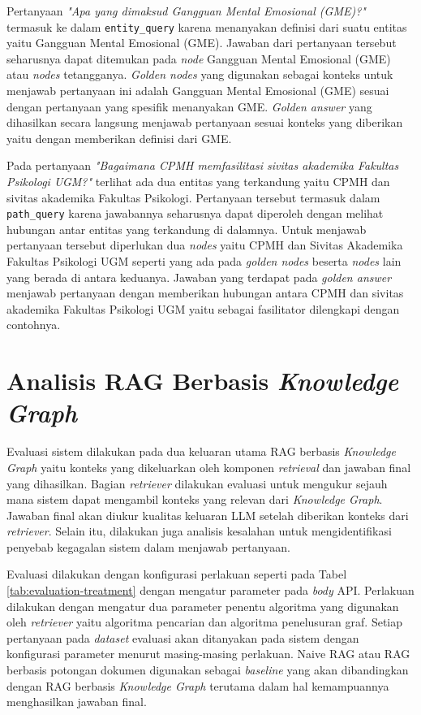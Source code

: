 Pertanyaan \textit{"Apa yang dimaksud Gangguan Mental Emosional (GME)?"} termasuk ke dalam \texttt{entity\_query} karena menanyakan definisi dari suatu entitas yaitu Gangguan Mental Emosional (GME).
Jawaban dari pertanyaan tersebut seharusnya dapat ditemukan pada \textit{node} Gangguan Mental Emosional (GME) atau \textit{nodes} tetangganya.
\textit{Golden nodes} yang digunakan sebagai konteks untuk menjawab pertanyaan ini adalah Gangguan Mental Emosional (GME) sesuai dengan pertanyaan yang spesifik menanyakan GME.
\textit{Golden answer} yang dihasilkan secara langsung menjawab pertanyaan sesuai konteks yang diberikan yaitu dengan memberikan definisi dari GME.

Pada pertanyaan \textit{"Bagaimana CPMH memfasilitasi sivitas akademika Fakultas Psikologi UGM?"} terlihat ada dua entitas yang terkandung yaitu CPMH dan sivitas akademika Fakultas Psikologi.
Pertanyaan tersebut termasuk dalam \texttt{path\_query} karena jawabannya seharusnya dapat diperoleh dengan melihat hubungan antar entitas yang terkandung di dalamnya.
Untuk menjawab pertanyaan tersebut diperlukan dua \textit{nodes} yaitu CPMH dan Sivitas Akademika Fakultas Psikologi UGM seperti yang ada pada \textit{golden nodes} beserta \textit{nodes} lain yang berada di antara keduanya.
Jawaban yang terdapat pada \textit{golden answer} menjawab pertanyaan dengan memberikan hubungan antara CPMH dan sivitas akademika Fakultas Psikologi UGM yaitu sebagai fasilitator dilengkapi dengan contohnya.

\section{Analisis RAG Berbasis \textit{Knowledge Graph}}
Evaluasi sistem dilakukan pada dua keluaran utama RAG berbasis \textit{Knowledge Graph} yaitu konteks yang dikeluarkan oleh komponen \textit{retrieval} dan jawaban final yang dihasilkan.
Bagian \textit{retriever} dilakukan evaluasi untuk mengukur sejauh mana sistem dapat mengambil konteks yang relevan dari \textit{Knowledge Graph}.
Jawaban final akan diukur kualitas keluaran LLM setelah diberikan konteks dari \textit{retriever}.
Selain itu, dilakukan juga analisis kesalahan untuk mengidentifikasi penyebab kegagalan sistem dalam menjawab pertanyaan.

Evaluasi dilakukan dengan konfigurasi perlakuan seperti pada Tabel \ref{tab:evaluation-treatment} dengan mengatur parameter pada \textit{body} API.
Perlakuan dilakukan dengan mengatur dua parameter penentu algoritma yang digunakan oleh \textit{retriever} yaitu algoritma pencarian dan algoritma penelusuran graf.
Setiap pertanyaan pada \textit{dataset} evaluasi akan ditanyakan pada sistem dengan konfigurasi parameter menurut masing-masing perlakuan.
Naive RAG atau RAG berbasis potongan dokumen digunakan sebagai \textit{baseline} yang akan dibandingkan dengan RAG berbasis \textit{Knowledge Graph} terutama dalam hal kemampuannya menghasilkan jawaban final.

